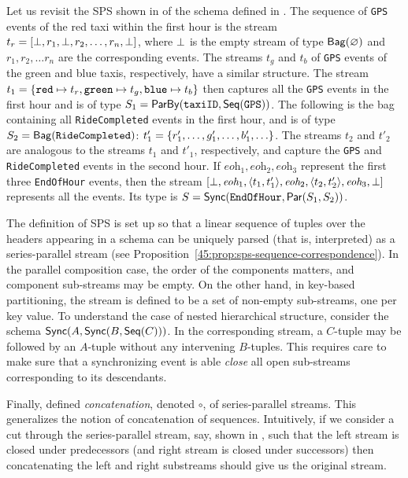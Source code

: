 \newcommand{\eohevent}{\textit{eoh}}
\begin{example}
\label{45:ex:text-sps}
Let us revisit the SPS shown in  of the schema defined in .
The sequence of \texttt{GPS} events of the red taxi within the first hour is
the stream $t_r=[\bot,r_1,\bot,r_2,\ldots, r_n,\bot]$, where $\bot$ is the empty stream of type
$\mathsf{Bag}({\varnothing})$
and $r_1, r_2, \ldots r_n$ are the corresponding events.
The streams $t_g$ and $t_b$ of \texttt{GPS} events of the green and blue taxis, respectively, have a similar structure.
The stream $t_1 = \{{\texttt{red}}\mapsto{t_r},{\texttt{green}}\mapsto{t_g},{\texttt{blue}}\mapsto{t_b} \}$ then captures all the \texttt{GPS} events in the first hour and is of type
$S_1 = \mathsf{ParBy}({\texttt{taxiID}}, \mathsf{Seq}({\texttt{GPS}}))$.
The following is the bag containing
all \texttt{RideCompleted} events in the first hour,
and is of type $S_2 = \mathsf{Bag}({\texttt{RideCompleted}})$:
$t'_1=\{r'_1,\ldots,g'_1,\ldots,b'_1,\ldots\}$.
The streams $t_2$ and $t'_2$ are analogous to the streams $t_1$ and $t'_1$, respectively,
and capture the \texttt{GPS}  and \texttt{RideCompleted} events in the second hour.
If $\eohevent_1, \eohevent_2, \eohevent_3$ represent the first three \texttt{EndOfHour} events,
then the stream
$[\spsemp,\eohevent_1,\spspar{t_1}{t'_1},\eohevent_2,\spspar{t_2}{t'_2},\eohevent_3,\spsemp]$
represents all the events.
Its type is $S = \mathsf{Sync}({\texttt{EndOfHour}}, \mathsf{Par}({S_1}, {S_2}))$.
\end{example}

The definition of SPS is set up so that a linear sequence of tuples over the headers
appearing in a schema can be uniquely parsed (that is, interpreted) as a series-parallel
stream (see Proposition~\ref{45:prop:sps-sequence-correspondence}). In the parallel composition case, the order of the components matters, and component sub-streams may be empty. On the other hand, in key-based
partitioning, the stream is defined to be a set of non-empty sub-streams, one per key value.
To understand the case of nested hierarchical structure, consider the schema
$\mathsf{Sync}({A}, \mathsf{Sync}({B}, \mathsf{Seq}({C})))$. In the corresponding stream,
a $C$-tuple may be followed by an $A$-tuple without any intervening $B$-tuples.
This requires care to make sure that a synchronizing event is able \emph{close}
all open sub-streams corresponding to its descendants.

Finally,  defined \emph{concatenation}, denoted $\circ$, of series-parallel streams.
This generalizes the notion of concatenation of sequences.
Intuitively, if we consider a cut through the series-parallel stream, say, shown in , such that the left stream is closed under predecessors (and right stream
is closed under successors) then concatenating the left and right substreams should give us the
original stream.

